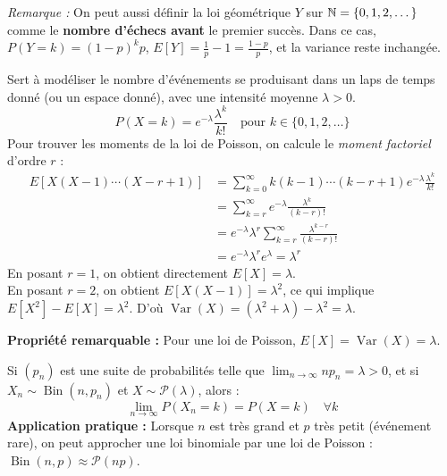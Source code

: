 \begin{description}
    \textit{Remarque :} On peut aussi définir la loi géométrique $Y$ sur $\mathbb{N} = \{0, 1, 2, \dots\}$ comme le \textbf{nombre d'échecs avant} le premier succès. Dans ce cas, $P(Y=k) = (1-p)^kp$, $E[Y] = \frac{1}{p}-1 = \frac{1-p}{p}$, et la variance reste inchangée.

    \item[Loi de Poisson $\mathcal{P}(\lambda)$ :]
    Sert à modéliser le nombre d'événements se produisant dans un laps de temps donné (ou un espace donné), avec une intensité moyenne $\lambda > 0$.
    \[
    P(X=k) = e^{-\lambda} \frac{\lambda^k}{k!} \quad \text{pour } k \in \{0, 1, 2, \dots\}
    \]
    Pour trouver les moments de la loi de Poisson, on calcule le \textit{moment factoriel} d'ordre $r$ :
    \begin{align*}
        E[X(X-1)\dotsm(X-r+1)] &= \sum_{k=0}^\infty k(k-1)\dotsm(k-r+1) e^{-\lambda} \frac{\lambda^k}{k!} \\
        &= \sum_{k=r}^\infty e^{-\lambda} \frac{\lambda^k}{(k-r)!} \\
        &= e^{-\lambda} \lambda^r \sum_{k=r}^\infty \frac{\lambda^{k-r}}{(k-r)!} \\
        &= e^{-\lambda} \lambda^r e^{\lambda} = \lambda^r
    \end{align*}
    En posant $r=1$, on obtient directement $E[X] = \lambda$. \\
    En posant $r=2$, on obtient $E[X(X-1)] = \lambda^2$, ce qui implique $E[X^2] - E[X] = \lambda^2$. D'où $\operatorname{Var}(X) = (\lambda^2 + \lambda) - \lambda^2 = \lambda$.
    
    \textbf{Propriété remarquable :} Pour une loi de Poisson, $E[X] = \operatorname{Var}(X) = \lambda$.

    \item[Loi des événements rares (Approximation de Poisson) :]
    Si $(p_n)$ est une suite de probabilités telle que $\lim_{n\to\infty} n p_n = \lambda > 0$, et si $X_n \sim \operatorname{Bin}(n, p_n)$ et $X \sim \mathcal{P}(\lambda)$, alors :
    \[
    \lim_{n\to \infty} P(X_n = k) = P(X = k) \quad \forall k
    \]
    \textbf{Application pratique :} Lorsque $n$ est très grand et $p$ très petit (événement rare), on peut approcher une loi binomiale par une loi de Poisson : $\operatorname{Bin}(n,p) \approx \mathcal{P}(np)$. 
    

\end{description}
